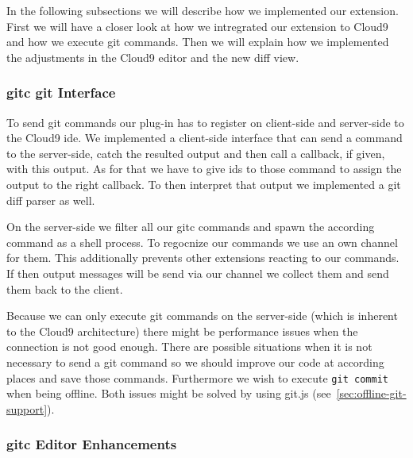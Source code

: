 In the following subsections we will describe how we implemented our extension.
First we will have a closer look at how we intregrated our extension to Cloud9 and how we execute git commands.
Then we will explain how we implemented the adjustments in the Cloud9 editor and the new diff view.

\subsubsection{gitc git Interface}

To send git commands our plug-in has to register on client-side and server-side to the Cloud9 ide.
We implemented a client-side interface that can send a command to the server-side, catch the resulted output and then call a callback, if given, with this output.
As for that we have to give ids to those command to assign the output to the right callback.
To then interpret that output we implemented a git diff parser as well. 

On the server-side we filter all our gitc commands and spawn the according command as a shell process.
To regocnize our commands we use an own channel for them.
This additionally prevents other extensions reacting to our commands.
If then output messages will be send via our channel we collect them and send them back to the client.

Because we can only execute git commands on the server-side (which is inherent to the Cloud9 architecture) there might be performance issues when the connection is not good enough.
There are possible situations when it is not necessary to send a git command so we should improve our code at according places and save those commands.
Furthermore we wish to execute \texttt{git commit} when being offline.
Both issues might be solved by using git.js (see~\ref{sec:offline-git-support}).

\subsubsection{gitc Editor Enhancements}
\label{sec:ext_editor}

